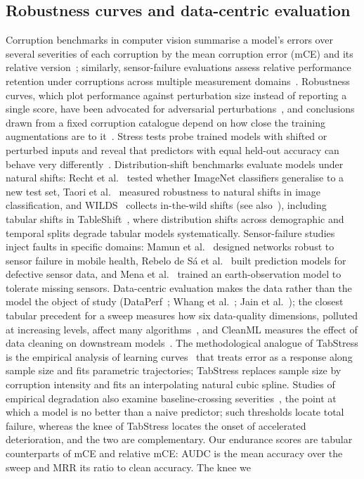 \documentclass[pdflatex,sn-mathphys]{sn-jnl}
\theoremstyle{thmstyleone}
\theoremstyle{thmstyletwo}
\theoremstyle{thmstylethree}
\begin{document}
\subsection{Robustness curves and data-centric evaluation}\label{sec:related:curves}

Corruption benchmarks in computer vision summarise a model's errors over several severities of each corruption by the mean corruption error (mCE) and its relative version~\cite{hendrycks2019benchmarking}; similarly, sensor-failure evaluations assess relative performance retention under corruptions across multiple measurement domains~\cite{mena2025multisensor}. Robustness curves, which plot performance against perturbation size instead of reporting a single score, have been advocated for adversarial perturbations~\cite{gopfert2020adversarial}, and conclusions drawn from a fixed corruption catalogue depend on how close the training augmentations are to it~\cite{mintun2021interaction}. Stress tests probe trained models with shifted or perturbed inputs and reveal that predictors with equal held-out accuracy can behave very differently~\cite{damour2022underspecification}. Distribution-shift benchmarks evaluate models under natural shifts: Recht et al.~\cite{recht2019imagenet} tested whether ImageNet classifiers generalise to a new test set, Taori et al.~\cite{taori2020measuring} measured robustness to natural shifts in image classification, and WILDS~\cite{koh2021wilds} collects in-the-wild shifts (see also~\cite{quinonero2009dataset}), including tabular shifts in TableShift~\cite{gardner2023tableshift}, where distribution shifts across demographic and temporal splits degrade tabular models systematically. Sensor-failure studies inject faults in specific domains: Mamun et al.~\cite{mamun2022designing} designed networks robust to sensor failure in mobile health, Rebelo de S\'a et al.~\cite{rebelodesa2019building} built prediction models for defective sensor data, and Mena et al.~\cite{mena2025multisensor} trained an earth-observation model to tolerate missing sensors. Data-centric evaluation makes the data rather than the model the object of study (DataPerf~\cite{mazumder2023dataperf}; Whang et al.~\cite{whang2023data}; Jain et al.~\cite{jain2020overview}); the closest tabular precedent for a sweep measures how six data-quality dimensions, polluted at increasing levels, affect many algorithms~\cite{mohammed2025effects}, and CleanML measures the effect of data cleaning on downstream models~\cite{li2021cleanml}. The methodological analogue of TabStress is the empirical analysis of learning curves~\cite{perlich2003tree} that treats error as a response along sample size and fits parametric trajectories; TabStress replaces sample size by corruption intensity and fits an interpolating natural cubic spline. Studies of empirical degradation also examine baseline-crossing severities~\cite{mena2025multisensor}, the point at which a model is no better than a naive predictor; such thresholds locate total failure, whereas the knee of TabStress locates the onset of accelerated deterioration, and the two are complementary. Our endurance scores are tabular counterparts of mCE and relative mCE: AUDC is the mean accuracy over the sweep and MRR its ratio to clean accuracy. The knee we 
\end{document}

